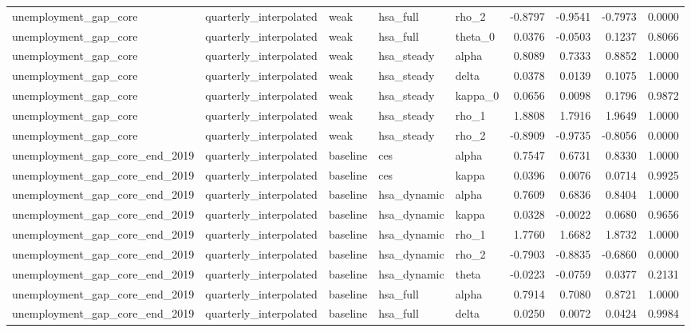 \begin{tabular}{lllllrrrr}
unemployment\_gap\_core & quarterly\_interpolated & weak & hsa\_full & rho\_2 & -0.8797 & -0.9541 & -0.7973 & 0.0000 \\
unemployment\_gap\_core & quarterly\_interpolated & weak & hsa\_full & theta\_0 & 0.0376 & -0.0503 & 0.1237 & 0.8066 \\
unemployment\_gap\_core & quarterly\_interpolated & weak & hsa\_steady & alpha & 0.8089 & 0.7333 & 0.8852 & 1.0000 \\
unemployment\_gap\_core & quarterly\_interpolated & weak & hsa\_steady & delta & 0.0378 & 0.0139 & 0.1075 & 1.0000 \\
unemployment\_gap\_core & quarterly\_interpolated & weak & hsa\_steady & kappa\_0 & 0.0656 & 0.0098 & 0.1796 & 0.9872 \\
unemployment\_gap\_core & quarterly\_interpolated & weak & hsa\_steady & rho\_1 & 1.8808 & 1.7916 & 1.9649 & 1.0000 \\
unemployment\_gap\_core & quarterly\_interpolated & weak & hsa\_steady & rho\_2 & -0.8909 & -0.9735 & -0.8056 & 0.0000 \\
unemployment\_gap\_core\_end\_2019 & quarterly\_interpolated & baseline & ces & alpha & 0.7547 & 0.6731 & 0.8330 & 1.0000 \\
unemployment\_gap\_core\_end\_2019 & quarterly\_interpolated & baseline & ces & kappa & 0.0396 & 0.0076 & 0.0714 & 0.9925 \\
unemployment\_gap\_core\_end\_2019 & quarterly\_interpolated & baseline & hsa\_dynamic & alpha & 0.7609 & 0.6836 & 0.8404 & 1.0000 \\
unemployment\_gap\_core\_end\_2019 & quarterly\_interpolated & baseline & hsa\_dynamic & kappa & 0.0328 & -0.0022 & 0.0680 & 0.9656 \\
unemployment\_gap\_core\_end\_2019 & quarterly\_interpolated & baseline & hsa\_dynamic & rho\_1 & 1.7760 & 1.6682 & 1.8732 & 1.0000 \\
unemployment\_gap\_core\_end\_2019 & quarterly\_interpolated & baseline & hsa\_dynamic & rho\_2 & -0.7903 & -0.8835 & -0.6860 & 0.0000 \\
unemployment\_gap\_core\_end\_2019 & quarterly\_interpolated & baseline & hsa\_dynamic & theta & -0.0223 & -0.0759 & 0.0377 & 0.2131 \\
unemployment\_gap\_core\_end\_2019 & quarterly\_interpolated & baseline & hsa\_full & alpha & 0.7914 & 0.7080 & 0.8721 & 1.0000 \\
unemployment\_gap\_core\_end\_2019 & quarterly\_interpolated & baseline & hsa\_full & delta & 0.0250 & 0.0072 & 0.0424 & 0.9984 \\

\end{tabular}
